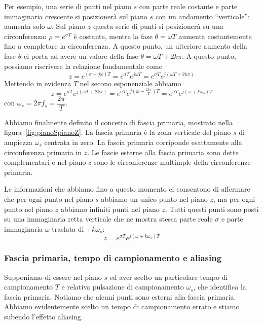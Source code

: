 \documentclass[a4paper]{report}
\begin{document}
Per esempio, una serie di punti nel piano $s$ con parte reale costante
e parte immaginaria crescente si posizioner\`a sul piano $s$ con un
andamento ``verticale'': aumenta solo $\omega$. Sul piano $z$ questa
serie di punti si posizioner\`a su una circonferenza: $\rho =
e^{\sigma T}$ \`e costante, mentre la fase $\theta = \omega T$ aumenta
costantemente fino a completare la circonferenza. A questo punto, un
ulteriore aumento della fase $\theta$ ci porta ad avere un valore
della fase $\theta = \omega T + 2k \pi$. A questo punto, possiamo
riscrivere la relazione fondamentale come
\[
z = e^{(\sigma + j \omega)T} = e^{\sigma T} e^{j \omega T} = e^{\sigma
  T}e^{j(\omega T + 2k \pi)}
\]
Mettendo in evidenza $T$ nel secono esponenziale abbiamo
\[
z = e^{\sigma T}e^{j(\omega T + 2k \pi)} = e^{\sigma T} e^{j(\omega +
  \frac{2 k \pi}{T})T} = e^{\sigma T} e^{j(\omega + k \omega_s)T}
\]
con $\omega_s = 2 \pi f_s = \dfrac{2 \pi}{T}$.

Abbiamo finalmente definito il concetto di fascia
primaria, mostrato nella
figura~\ref{fig:pianoSpianoZ}. La fascia primaria \`e la zona 
verticale del piano $s$ di ampiezza $\omega_s$ centrata in zero. La 
fascia primaria corriponde esattamente alla circonferenza primaria in
$z$. Le fascie esterne alla fascia primaria sono dette complementari e
nel piano $z$ sono le circonferenze multimple della circonferenze
primaria.

Le informazioni che abbiamo fino a questo momento ci consentono di
affermare che per ogni punto nel piano $s$ abbiamo un unico punto nel
piano $z$, ma per ogni punto nel piano $z$ abbiamo infiniti punti nel
piano $z$. Tutti questi punti sono posti su una immaginaria retta
verticale che ne mostra stessa parte reale $\sigma$ e parte
immaginaria $\omega$ traslata di $\pm k \omega_s$:
\begin{equation}
  z = e^{\sigma T} e^{j(\omega + k \omega_s)T}
\end{equation}

\subsubsection{Fascia primaria, tempo di campionamento e aliasing}
Supponiamo di essere nel piano $s$ ed aver scelto un particolare tempo
di campionamento $T$ e relativa pulsazione di campionamento
$\omega_s$, che identifica la fascia primaria. Notiamo che alcuni
punti sono esterni alla fascia primaria. Abbiamo evidentemente scelto
un tempo di campionamento errato e stiamo subendo l'effetto aliasing.
\end{document}
